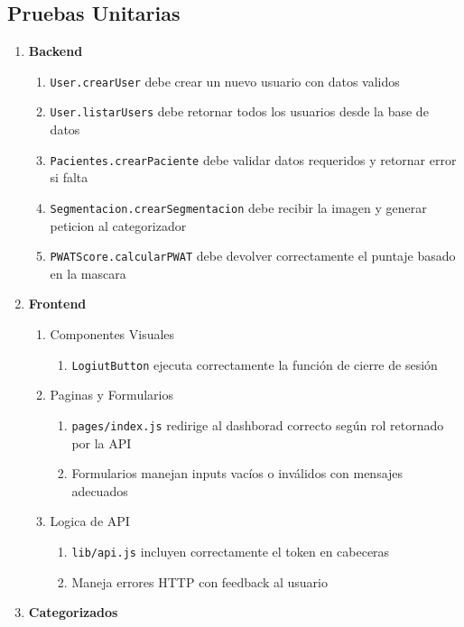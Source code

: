 \subsection{Pruebas Unitarias}
\label{ssc:UT}

\begin{enumerate}
    \item \textbf{Backend}
    \begin{enumerate}
        \item \texttt{User.crearUser} debe crear un nuevo usuario con datos validos
        \item \texttt{User.listarUsers} debe retornar todos los usuarios desde la base de datos
        \item \texttt{Pacientes.crearPaciente} debe validar datos requeridos y retornar error si falta
        \item \texttt{Segmentacion.crearSegmentacion} debe recibir la imagen y generar peticion al categorizador
        \item \texttt{PWATScore.calcularPWAT} debe devolver correctamente el puntaje basado en la mascara
    \end{enumerate}
\item \textbf{Frontend}
\begin{enumerate}
    \item Componentes Visuales
    \begin{enumerate}
        \item \texttt{LogiutButton} ejecuta correctamente la función de cierre de sesión
    \end{enumerate}
\item Paginas y Formularios
\begin{enumerate}
    \item \texttt{pages/index.js} redirige al dashborad correcto según rol retornado por la API
    \item Formularios manejan inputs vacíos o inválidos con mensajes adecuados
\end{enumerate}
\item Logica de API
\begin{enumerate}
    \item \texttt{lib/api.js} incluyen correctamente el token en cabeceras
    \item Maneja errores HTTP con feedback al usuario
\end{enumerate}
\end{enumerate}
\item \textbf{Categorizados}
\begin{enumerate}

\end{enumerate}
\end{enumerate}
